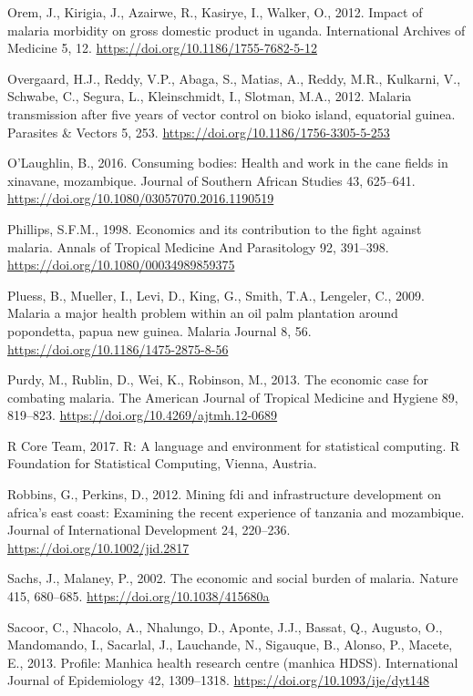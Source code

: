 \documentclass[]{article}
\begin{document}
\hypertarget{ref-Orem_2012}{}
Orem, J., Kirigia, J., Azairwe, R., Kasirye, I., Walker, O., 2012.
Impact of malaria morbidity on gross domestic product in uganda.
International Archives of Medicine 5, 12.
\url{https://doi.org/10.1186/1755-7682-5-12}

\hypertarget{ref-Overgaard2012}{}
Overgaard, H.J., Reddy, V.P., Abaga, S., Matias, A., Reddy, M.R.,
Kulkarni, V., Schwabe, C., Segura, L., Kleinschmidt, I., Slotman, M.A.,
2012. Malaria transmission after five years of vector control on bioko
island, equatorial guinea. Parasites \& Vectors 5, 253.
\url{https://doi.org/10.1186/1756-3305-5-253}

\hypertarget{ref-OLaughlin2016}{}
O'Laughlin, B., 2016. Consuming bodies: Health and work in the cane
fields in xinavane, mozambique. Journal of Southern African Studies 43,
625--641. \url{https://doi.org/10.1080/03057070.2016.1190519}

\hypertarget{ref-Phillips98}{}
Phillips, S.F.M., 1998. Economics and its contribution to the fight
against malaria. Annals of Tropical Medicine And Parasitology 92,
391--398. \url{https://doi.org/10.1080/00034989859375}

\hypertarget{ref-Pluess2009}{}
Pluess, B., Mueller, I., Levi, D., King, G., Smith, T.A., Lengeler, C.,
2009. Malaria a major health problem within an oil palm plantation
around popondetta, papua new guinea. Malaria Journal 8, 56.
\url{https://doi.org/10.1186/1475-2875-8-56}

\hypertarget{ref-Purdy_2013}{}
Purdy, M., Rublin, D., Wei, K., Robinson, M., 2013. The economic case
for combating malaria. The American Journal of Tropical Medicine and
Hygiene 89, 819--823. \url{https://doi.org/10.4269/ajtmh.12-0689}

\hypertarget{ref-R}{}
R Core Team, 2017. R: A language and environment for statistical
computing. R Foundation for Statistical Computing, Vienna, Austria.

\hypertarget{ref-Robbins2012}{}
Robbins, G., Perkins, D., 2012. Mining fdi and infrastructure
development on africa's east coast: Examining the recent experience of
tanzania and mozambique. Journal of International Development 24,
220--236. \url{https://doi.org/10.1002/jid.2817}

\hypertarget{ref-Sachs2002}{}
Sachs, J., Malaney, P., 2002. The economic and social burden of malaria.
Nature 415, 680--685. \url{https://doi.org/10.1038/415680a}

\hypertarget{ref-Sacoor2013}{}
Sacoor, C., Nhacolo, A., Nhalungo, D., Aponte, J.J., Bassat, Q.,
Augusto, O., Mandomando, I., Sacarlal, J., Lauchande, N., Sigauque, B.,
Alonso, P., Macete, E., 2013. Profile: Manhica health research centre
(manhica HDSS). International Journal of Epidemiology 42, 1309--1318.
\url{https://doi.org/10.1093/ije/dyt148}
\end{document}

